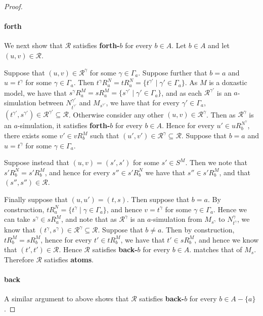 \begin{proof}
\paragraph{forth} We next show that $\mathcal{R}$ satisfies {\bf forth-$b$} for
every $b \in A$.  Let $b \in A$ and let $(u, v) \in \mathcal{R}$.

Suppose that $(u, v) \in \mathcal{R}^\gamma$ for some $\gamma \in \Gamma_a$.
Suppose further that $b = a$ and $u = t^\gamma$ for some $\gamma \in \Gamma_a$.
Then $t^\gamma R^N_a = tR^N_a = \{t^{\gamma'} \mid \gamma' \in \Gamma_a\}$.  As
$M$ is a doxastic model, we have that $s^\gamma R^M_a = sR^M_a = \{s^{\gamma'}
\mid \gamma' \in \Gamma_a\}$, and as each $\mathcal{R}^{\gamma'}$ is an
$a$-simulation between $N^{\gamma'}_{t^{\gamma'}}$ and $M_{s^{\gamma'}}$, we
have that for every $\gamma' \in \Gamma_a$, $(t^{\gamma'}, s^{\gamma'}) \in
\mathcal{R}^{\gamma'} \subseteq \mathcal{R}$. Otherwise consider any other $(u,
v) \in \mathcal{R}^\gamma$.  Then as $\mathcal{R}^\gamma$ is an $a$-simulation,
it satisfies {\bf forth-$b$} for every $b \in A$. Hence for every $u' \in
uR^{N^\gamma}_b$, there exists some $v' \in vR^M_b$ such that $(u', v') \in
\mathcal{R}^\gamma \subseteq \mathcal{R}$. Suppose that $b = a$ and $u =
t^\gamma$ for some $\gamma \in \Gamma_a$.  

Suppose instead that $(u, v) = (s', s')$ for some $s' \in S^M$.  Then we note
that $s'R^N_b = s'R^M_b$, and hence for every $s'' \in s'R^N_b$ we have that
$s'' \in s'R^M_b$, and that $(s'', s'') \in \mathcal{R}$. 

Finally suppose that $(u, u') = (t, s)$. Then suppose that $b = a$. By
construction, $tR^N_a = \{t^\gamma \mid \gamma \in \Gamma_a\}$, and hence $v =
t^\gamma$ for some $\gamma \in \Gamma_a$. Hence we can take $s^\gamma \in
sR^M_a$, and note that as $\mathcal{R}^\gamma$ is an $a$-simulation from
$M_{s^\gamma}$ to $N^\gamma_{t^\gamma}$, we know that $(t^\gamma, s^\gamma) \in
\mathcal{R}^\gamma \subseteq \mathcal{R}$. Suppose that $b \neq a$. Then by
construction, $tR^M_b = sR^M_b$, hence for every $t' \in tR^M_b$, we have that
$t' \in sR^M_b$, and hence we know that $(t', t') \in \mathcal{R}$. Hence
$\mathcal{R}$ satisfies {\bf back-$b$} for every $b \in A$.  matches that of
$M_s$. Therefore $\mathcal{R}$ satisfies {\bf atoms}.

\paragraph{back} A similar argument to above shows that $\mathcal{R}$ satisfies
{\bf back-$b$} for every $b \in A - \{a\}$.


\end{proof}
